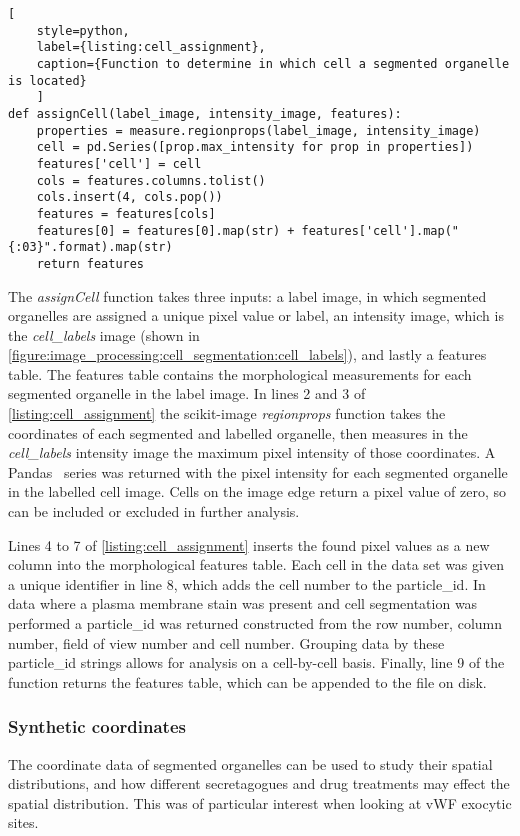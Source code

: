 \begin{lstlisting}[
	style=python,
	label={listing:cell_assignment},
	caption={Function to determine in which cell a segmented organelle is located}
	]
def assignCell(label_image, intensity_image, features):
    properties = measure.regionprops(label_image, intensity_image)
    cell = pd.Series([prop.max_intensity for prop in properties])
    features['cell'] = cell
    cols = features.columns.tolist()
    cols.insert(4, cols.pop())
    features = features[cols]
    features[0] = features[0].map(str) + features['cell'].map("{:03}".format).map(str)
    return features
\end{lstlisting}

The \emph{assignCell} function takes three inputs: a label image, in which segmented organelles are assigned a unique pixel value or label, an intensity image, which is the \emph{cell\_labels} image (shown in \autoref{figure:image_processing:cell_segmentation:cell_labels}), and lastly a features table. The features table contains the morphological measurements for each segmented organelle in the label image. In lines 2 and 3 of \autoref{listing:cell_assignment} the scikit-image \emph{regionprops} function takes the coordinates of each segmented and labelled organelle, then measures in the \emph{cell\_labels} intensity image the maximum pixel intensity of those coordinates. A Pandas~\cite{McKinney2011} series was returned with the pixel intensity for each segmented organelle in the labelled cell image. Cells on the image edge return a pixel value of zero, so can be included or excluded in further analysis.

Lines 4 to 7 of \autoref{listing:cell_assignment} inserts the found pixel values as a new column into the morphological features table. Each cell in the data set was given a unique identifier in line 8, which adds the cell number to the particle\_id. In data where a plasma membrane stain was present and cell segmentation was performed a particle\_id was returned constructed from the row number, column number, field of view number and cell number. Grouping data by these particle\_id strings allows for analysis on a cell-by-cell basis. Finally, line 9 of the function returns the features table, which can be appended to the file on disk.

\subsubsection{Synthetic coordinates}
\label{endothelial_morphometry:image_processing:synthetic_coordinates}
The coordinate data of segmented organelles can be used to study their spatial distributions, and how different secretagogues and drug treatments may effect the spatial distribution. This was of particular interest when looking at vWF exocytic sites.

